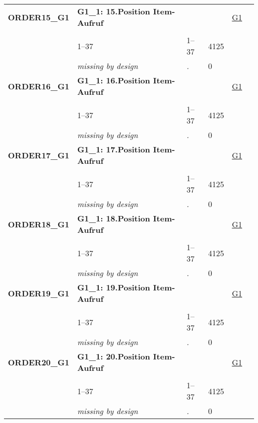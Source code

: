 \begin{longtable}{| L{2.45cm} | L{6cm} | C{1.5cm} | R{1cm} | C{2.25cm} | C{2.25cm} |}
   \midrule
\textbf{ORDER15\_G1}\label{var:ORDER15:G1} & \textbf{G1\_1: 15.Position Item-Aufruf} &  &  & \hyperref[G1]{G1} & \hyperref[var:suf:]{} \\ 
   &  &  &  &  &  \\ 
   & 1--37 & 1--37 & 4125 &  &  \\ 
   & \textit{missing by design} & \textit{.} & 0 &  &  \\ 
   \midrule
\textbf{ORDER16\_G1}\label{var:ORDER16:G1} & \textbf{G1\_1: 16.Position Item-Aufruf} &  &  & \hyperref[G1]{G1} & \hyperref[var:suf:]{} \\ 
   &  &  &  &  &  \\ 
   & 1--37 & 1--37 & 4125 &  &  \\ 
   & \textit{missing by design} & \textit{.} & 0 &  &  \\ 
   \midrule
\textbf{ORDER17\_G1}\label{var:ORDER17:G1} & \textbf{G1\_1: 17.Position Item-Aufruf} &  &  & \hyperref[G1]{G1} & \hyperref[var:suf:]{} \\ 
   &  &  &  &  &  \\ 
   & 1--37 & 1--37 & 4125 &  &  \\ 
   & \textit{missing by design} & \textit{.} & 0 &  &  \\ 
   \midrule
\textbf{ORDER18\_G1}\label{var:ORDER18:G1} & \textbf{G1\_1: 18.Position Item-Aufruf} &  &  & \hyperref[G1]{G1} & \hyperref[var:suf:]{} \\ 
   &  &  &  &  &  \\ 
   & 1--37 & 1--37 & 4125 &  &  \\ 
   & \textit{missing by design} & \textit{.} & 0 &  &  \\ 
   \midrule
\textbf{ORDER19\_G1}\label{var:ORDER19:G1} & \textbf{G1\_1: 19.Position Item-Aufruf} &  &  & \hyperref[G1]{G1} & \hyperref[var:suf:]{} \\ 
   &  &  &  &  &  \\ 
   & 1--37 & 1--37 & 4125 &  &  \\ 
   & \textit{missing by design} & \textit{.} & 0 &  &  \\ 
   \midrule
\textbf{ORDER20\_G1}\label{var:ORDER20:G1} & \textbf{G1\_1: 20.Position Item-Aufruf} &  &  & \hyperref[G1]{G1} & \hyperref[var:suf:]{} \\ 
   &  &  &  &  &  \\ 
   & 1--37 & 1--37 & 4125 &  &  \\ 
   & \textit{missing by design} & \textit{.} & 0 &  &  \\ 

\end{longtable}

